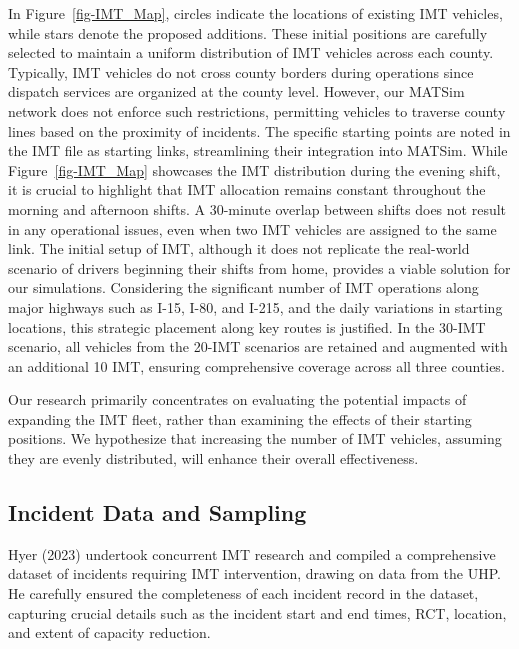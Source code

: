 \documentclass[fancy, oneside, mastersfancy, ms]{byuthesis}
\begin{document}
In Figure~\ref{fig-IMT_Map}, circles indicate the locations of existing
IMT vehicles, while stars denote the proposed additions. These initial
positions are carefully selected to maintain a uniform distribution of
IMT vehicles across each county. Typically, IMT vehicles do not cross
county borders during operations since dispatch services are organized
at the county level. However, our MATSim network does not enforce such
restrictions, permitting vehicles to traverse county lines based on the
proximity of incidents. The specific starting points are noted in the
IMT file as starting links, streamlining their integration into MATSim.
While Figure~\ref{fig-IMT_Map} showcases the IMT distribution during the
evening shift, it is crucial to highlight that IMT allocation remains
constant throughout the morning and afternoon shifts. A 30-minute
overlap between shifts does not result in any operational issues, even
when two IMT vehicles are assigned to the same link. The initial setup
of IMT, although it does not replicate the real-world scenario of
drivers beginning their shifts from home, provides a viable solution for
our simulations. Considering the significant number of IMT operations
along major highways such as I-15, I-80, and I-215, and the daily
variations in starting locations, this strategic placement along key
routes is justified. In the 30-IMT scenario, all vehicles from the
20-IMT scenarios are retained and augmented with an additional 10 IMT,
ensuring comprehensive coverage across all three counties.

Our research primarily concentrates on evaluating the potential impacts
of expanding the IMT fleet, rather than examining the effects of their
starting positions. We hypothesize that increasing the number of IMT
vehicles, assuming they are evenly distributed, will enhance their
overall effectiveness.

\hypertarget{sec-inc_data}{%
\subsection{Incident Data and Sampling}\label{sec-inc_data}}

Hyer (2023) undertook concurrent IMT research and compiled a
comprehensive dataset of incidents requiring IMT intervention, drawing
on data from the UHP. He carefully ensured the completeness of each
incident record in the dataset, capturing crucial details such as the
incident start and end times, RCT, location, and extent of capacity
reduction.
\end{document}

